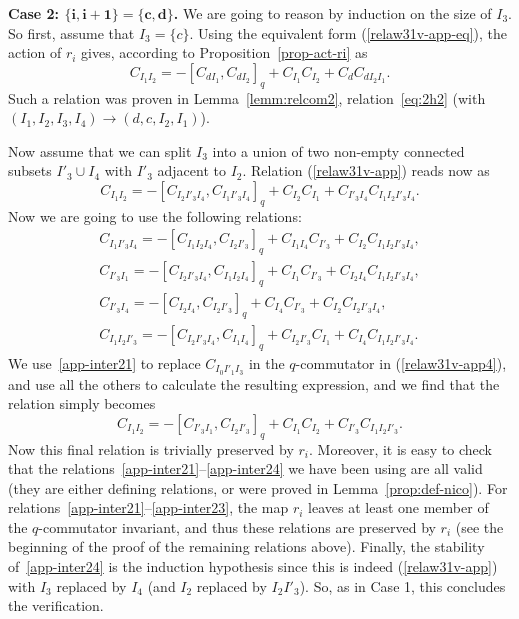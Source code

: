 \documentclass[10pt,a4paper]{amsart}
\numberwithin{equation}{section}
\theoremstyle{definition}
\begin{document}
\textbf{Case 2: $\boldsymbol{\{i,i+1\}=\{c,d\}}$.} We are going to reason by induction on the size of $I_3$. So first, assume that $I_3=\{c\}$. Using the equivalent form (\ref{relaw31v-app-eq}), the action of $r_i$ gives, according to Proposition~\ref{prop-act-ri} as
\[C_{I_1I_2}=-[C_{dI_1},C_{dI_2}]_q+C_{I_1}C_{I_2}+C_{d}C_{dI_2I_1} .\]
Such a relation was proven in Lemma~\ref{lemm:relcom2}, relation~\eqref{eq:2h2} (with $(I_1,I_2,I_3,I_4)\to (d,c,I_2,I_1)$).

Now assume that we can split $I_3$ into a union of two non-empty connected subsets $I'_3\cup I_4$ with $I'_3$ adjacent to $I_2$. Relation (\ref{relaw31v-app}) reads now as
\begin{equation}\label{relaw31v-app4}C_{I_1I_2}=-[C_{I_2I'_3I_4},C_{I_1I'_3I_4}]_q+C_{I_2}C_{I_1}+C_{I'_3I_4}C_{I_1I_2I'_3I_4} .
\end{equation}
Now we are going to use the following relations:
 \begin{gather}
C_{I_1I'_3I_4} =-[C_{I_1I_2I_4},C_{I_2I'_3}]_q+C_{I_1I_4}C_{I'_3}+C_{I_2}C_{I_1I_2I'_3I_4} , \label{app-inter21} \\
C_{I'_3I_1} =-[C_{I_2I'_3I_4},C_{I_1I_2I_4}]_q+C_{I_1}C_{I'_3}+C_{I_2I_4}C_{I_1I_2I'_3I_4} ,\label{app-inter22} \\
C_{I'_3I_4} =-[C_{I_2I_4},C_{I_2I'_3}]_q+C_{I_4}C_{I'_3}+C_{I_2}C_{I_2I'_3I_4} ,\label{app-inter23}\\
C_{I_1I_2I'_3} =-[C_{I_2I'_3I_4}, C_{I_1I_4}]_q +C_{I_2I'_3}C_{I_1}+C_{I_4}C_{I_1I_2I'_3I_4} .\label{app-inter24}
 \end{gather}
We use~\eqref{app-inter21} to replace $C_{I_0I'_1I_3}$ in the $q$-commutator in (\ref{relaw31v-app4}), and use all the others to calculate the resulting expression, and we find that the relation simply becomes
\begin{equation*}%
C_{I_1I_2}=-[C_{I'_3I_1},C_{I_2I'_3}]_q+C_{I_1}C_{I_2}+C_{I'_3}C_{I_1I_2I'_3} .
\end{equation*}
Now this final relation is trivially preserved by $r_i$. Moreover, it is easy to check that the relations~\eqref{app-inter21}--\eqref{app-inter24} we have been using are all valid (they are either defining relations, or were proved in Lemma~\ref{prop:def-nico}). For relations~\eqref{app-inter21}--\eqref{app-inter23}, the map $r_i$ leaves at least one member of the $q$-commutator invariant, and thus these relations are preserved by $r_i$ (see the beginning of the proof of the remaining relations above). Finally, the stability of~\eqref{app-inter24} is the induction hypothesis since this is indeed (\ref{relaw31v-app}) with $I_3$ replaced by $I_4$ (and $I_2$ replaced by $I_2I'_3$). So, as in Case 1, this concludes the verification.
\end{document}
